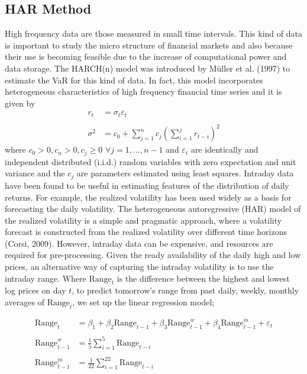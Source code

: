 \documentclass[a4paper,11pt,oneside]{book}
\begin{document}
\subsection{HAR Method}

High frequency data are those measured in small time intervals. This kind of data is important
to study the micro structure of financial markets and also because their use is becoming feasible
due to the increase of computational power and data storage. The HARCH(n) model was
introduced by Müller et al. (1997) to estimate the VaR for this kind of data. In fact, this model incorporates
heterogeneous characteristics of high frequency financial time series and it is given by 
\begin{equation}
\begin{aligned}
r_t &= \sigma_t\varepsilon_t
\\
\\
\sigma^2 &= c_0 + \sum_{j=1}^{n}c_j\left(\sum_{i=1}^{j}r_{t-i}\right)^2
\label{3}
\end{aligned}
\end{equation}
where $c_0>0, c_n > 0, c_j \ge 0$ $\forall j = 1,...,n-1$ and $\varepsilon_t$ are identically and independent distributed (i.i.d.) random variables with zero expectation and unit variance and the $c_j$ are parameters estimated using least squares.
\newline
\newline
Intraday data have been found to be useful in estimating features of the distribution of daily returns. For
example, the realized volatility has been used widely
as a basis for forecasting the daily volatility. The heterogeneous autoregressive (HAR) model of the realized
volatility is a simple and pragmatic approach, where a
volatility forecast is constructed from the realized volatility over different time horizons (Corsi, 2009). However,
intraday data can be expensive, and resources are required for pre-processing. Given the ready availability
of the daily high and low prices, an alternative way of
capturing the intraday volatility is to use the intraday range. Where $\text{Range}_{t}$
is the difference between the highest and
lowest log prices on day $t$, to predict tomorrow's range from past daily, weekly, monthly averages of $\text{Range}_{t}$, we set up the linear regression model;

\begin{equation}
\begin{aligned}
\text{Range}_{t}&=\beta_1+\beta_{2}\text{Range}_{t-1} + \beta_{3}\text{Range}^{w}_{t-1} + \beta_{4}\text{Range}^{m}_{t-1} + \varepsilon_t
\\
\\
\text{Range}^{w}_{t-1}&=\frac{1}{5}\sum_{i=1}^{5}\text{Range}_{t-i}
\\
\\
\text{Range}^{m}_{t-1}&=\frac{1}{22}\sum_{i=1}^{22}\text{Range}_{t-i}
\label{4}
\end{aligned}
\end{equation}
\end{document}
